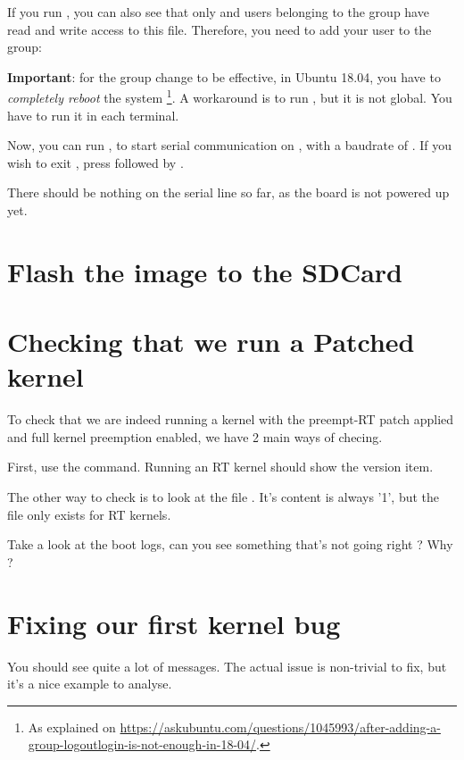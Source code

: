 If you run , you can also see that only
 and users belonging to the  group have
read and write access to this file. Therefore, you need to add your user
to the  group:


{\bf Important}: for the group change to be effective, in Ubuntu 18.04, you have to
{\em completely reboot} the system \footnote{As explained on
\url{https://askubuntu.com/questions/1045993/after-adding-a-group-logoutlogin-is-not-enough-in-18-04/}.}.
A workaround is to run , but it is not global.
You have to run it in each terminal.

Now, you can run , to start serial
communication on , with a baudrate of . If
you wish to exit , press \code{[Ctrl][a]} followed by
\code{[Ctrl][x]}.

There should be nothing on the serial line so far, as the board is not
powered up yet.

\section{Flash the image to the SDCard}

\section{Checking that we run a Patched kernel}

To check that we are indeed running a kernel with the preempt-RT patch applied and
full kernel preemption enabled, we have 2 main ways of checing.

First, use the  command. Running an RT kernel should show the  version item.

The other way to check is to look at the file . It's content is always '1', but the file only exists for RT kernels.

Take a look at the boot logs, can you see something that's not going right ? Why ?

\section{Fixing our first kernel bug}

You should see quite a lot of  messages. The
actual issue is non-trivial to fix, but it's a nice example to analyse.

